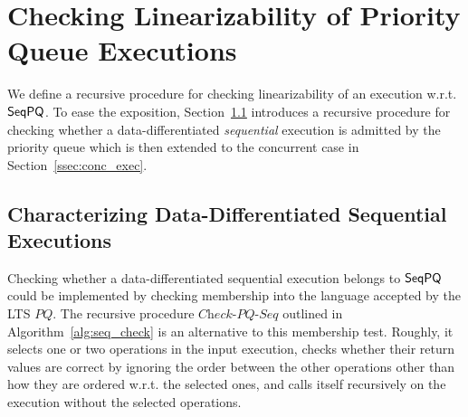 \section{Checking Linearizability of Priority Queue Executions}
\label{sec:checking inclusion by recursive procedure}

We define a recursive procedure for checking linearizability of an execution w.r.t. $\mathsf{SeqPQ}$.
To ease the exposition, Section~\ref{ssec:seq_exec} introduces a recursive procedure for checking whether a data-differentiated \emph{sequential} execution is admitted by the priority queue which is then extended to the concurrent case in Section~\ref{ssec:conc_exec}.

\subsection{Characterizing Data-Differentiated Sequential Executions}\label{ssec:seq_exec}

Checking whether a data-differentiated sequential execution belongs to $\mathsf{SeqPQ}$ could be implemented by checking membership into the language accepted by the LTS $PQ$. The recursive procedure $\textit{Check-PQ-Seq}$ outlined in Algorithm~\ref{alg:seq_check} is an alternative to this membership test. Roughly, it selects one or two operations in the input execution, checks whether their return values are correct by ignoring the order between the other operations other than how they are ordered w.r.t. the selected ones, and calls itself recursively on the execution without the selected operations. %

